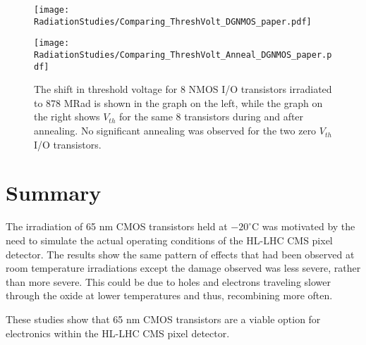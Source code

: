 \begin{figure}[htb!]
\begin{minipage}[b]{0.5\textwidth}
	\centering
	\texttt{[image: RadiationStudies/Comparing\_ThreshVolt\_DGNMOS\_paper.pdf]}
\end{minipage}
\hspace{0.5cm}
\begin{minipage}[b]{0.5\textwidth}
	\centering
	\texttt{[image: RadiationStudies/Comparing\_ThreshVolt\_Anneal\_DGNMOS\_paper.pdf]}
\end{minipage}
\caption{The shift in threshold voltage for 8 NMOS I/O transistors irradiated to 878 MRad is shown in the graph on the left, while the graph on the right shows $V_{th}$ for the same 8 transistors during and after annealing.  No significant annealing was observed for the two zero $V_{th}$ I/O transistors.}
\label{fig:DGNMOS_Vth}
\end{figure}

\section{Summary}

The irradiation of 65 nm CMOS transistors held at $-20^{\circ}\mathrm{C}$ was motivated by the need to simulate the actual operating conditions of the HL-LHC CMS pixel detector. The results show the same pattern of effects that had been observed at room temperature irradiations except the damage observed was less severe, rather than more severe. This could be due to holes and electrons traveling slower through the oxide at lower temperatures and thus, recombining more often\cite{RINCE}.

These studies show that 65 nm CMOS transistors are a viable option for electronics within the HL-LHC CMS pixel detector.

















